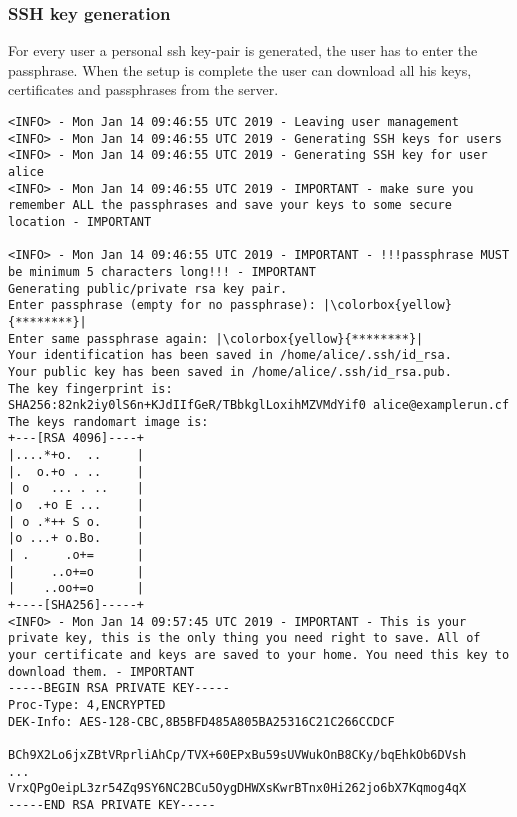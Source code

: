 \subsubsection{SSH key generation}
For every user a personal ssh key-pair is generated, the user has to enter the passphrase.
When the setup is complete the user can download all his keys, certificates and passphrases from the server.
\begin{lstlisting}[escapeinside=||]
<INFO> - Mon Jan 14 09:46:55 UTC 2019 - Leaving user management
<INFO> - Mon Jan 14 09:46:55 UTC 2019 - Generating SSH keys for users
<INFO> - Mon Jan 14 09:46:55 UTC 2019 - Generating SSH key for user alice
<INFO> - Mon Jan 14 09:46:55 UTC 2019 - IMPORTANT - make sure you remember ALL the passphrases and save your keys to some secure location - IMPORTANT
                                                                                                                                                                                                                                                                                                                                              
<INFO> - Mon Jan 14 09:46:55 UTC 2019 - IMPORTANT - !!!passphrase MUST be minimum 5 characters long!!! - IMPORTANT
Generating public/private rsa key pair.
Enter passphrase (empty for no passphrase): |\colorbox{yellow}{********}|
Enter same passphrase again: |\colorbox{yellow}{********}|
Your identification has been saved in /home/alice/.ssh/id_rsa.
Your public key has been saved in /home/alice/.ssh/id_rsa.pub.
The key fingerprint is:
SHA256:82nk2iy0lS6n+KJdIIfGeR/TBbkglLoxihMZVMdYif0 alice@examplerun.cf
The keys randomart image is:
+---[RSA 4096]----+
|....*+o.  ..     |
|.  o.+o . ..     |
| o   ... . ..    |
|o  .+o E ...     |
| o .*++ S o.     |
|o ...+ o.Bo.     |
| .     .o+=      |
|     ..o+=o      |
|    ..oo+=o      |
+----[SHA256]-----+
<INFO> - Mon Jan 14 09:57:45 UTC 2019 - IMPORTANT - This is your private key, this is the only thing you need right to save. All of your certificate and keys are saved to your home. You need this key to download them. - IMPORTANT  
-----BEGIN RSA PRIVATE KEY-----
Proc-Type: 4,ENCRYPTED
DEK-Info: AES-128-CBC,8B5BFD485A805BA25316C21C266CCDCF

BCh9X2Lo6jxZBtVRprliAhCp/TVX+60EPxBu59sUVWukOnB8CKy/bqEhkOb6DVsh
...
VrxQPgOeipL3zr54Zq9SY6NC2BCu5OygDHWXsKwrBTnx0Hi262jo6bX7Kqmog4qX
-----END RSA PRIVATE KEY-----
\end{lstlisting}

